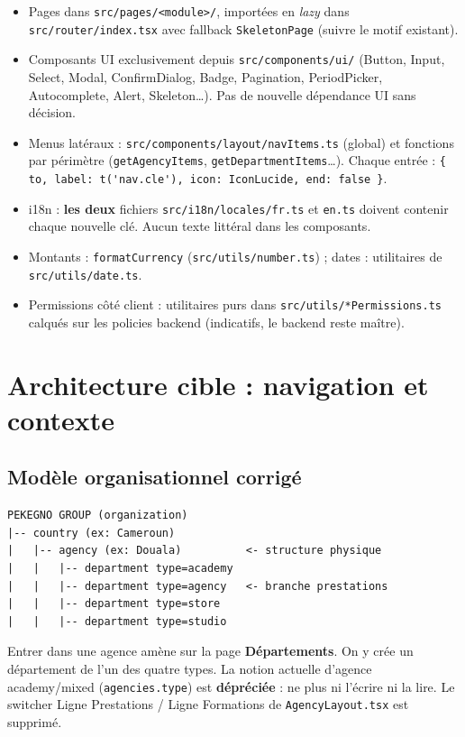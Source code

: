 \documentclass[11pt,a4paper]{article}
\begin{document}
\begin{itemize}[nosep]
  \item Pages dans \verb|src/pages/<module>/|, importées en \emph{lazy} dans \verb|src/router/index.tsx| avec fallback \verb|SkeletonPage| (suivre le motif existant).
  \item Composants UI exclusivement depuis \verb|src/components/ui/| (Button, Input, Select, Modal, ConfirmDialog, Badge, Pagination, PeriodPicker, Autocomplete, Alert, Skeleton\ldots). Pas de nouvelle dépendance UI sans décision.
  \item Menus latéraux : \verb|src/components/layout/navItems.ts| (global) et fonctions par périmètre (\verb|getAgencyItems|, \verb|getDepartmentItems|\ldots). Chaque entrée : \verb|{ to, label: t('nav.cle'), icon: IconLucide, end: false }|.
  \item i18n : \textbf{les deux} fichiers \verb|src/i18n/locales/fr.ts| et \verb|en.ts| doivent contenir chaque nouvelle clé. Aucun texte littéral dans les composants.
  \item Montants : \verb|formatCurrency| (\verb|src/utils/number.ts|) ; dates : utilitaires de \verb|src/utils/date.ts|.
  \item Permissions côté client : utilitaires purs dans \verb|src/utils/*Permissions.ts| calqués sur les policies backend (indicatifs, le backend reste maître).
\end{itemize}

\section{Architecture cible : navigation et contexte}\label{sec:navigation}

\subsection{Modèle organisationnel corrigé}

\begin{lstlisting}
PEKEGNO GROUP (organization)
|-- country (ex: Cameroun)
|   |-- agency (ex: Douala)          <- structure physique
|   |   |-- department type=academy
|   |   |-- department type=agency   <- branche prestations
|   |   |-- department type=store
|   |   |-- department type=studio
\end{lstlisting}

Entrer dans une agence amène sur la page \textbf{Départements}. On y crée un département de l'un des quatre types. La notion actuelle d'\og agence academy/mixed \fg{} (\verb|agencies.type|) est \textbf{dépréciée} : ne plus ni l'écrire ni la lire. Le switcher \og Ligne Prestations / Ligne Formations \fg{} de \verb|AgencyLayout.tsx| est supprimé.
\end{document}
